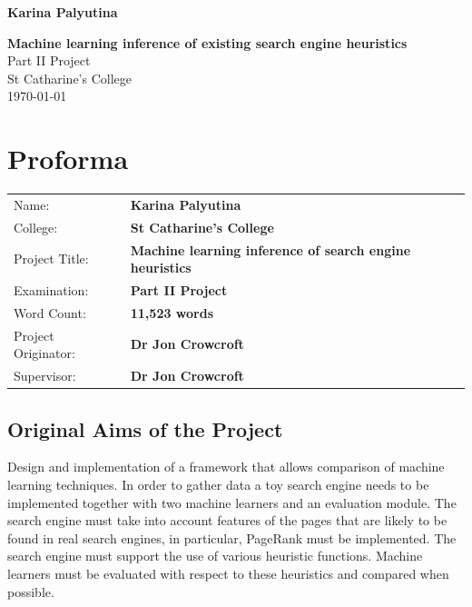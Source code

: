 \documentclass[12pt,a4paper,notitlepage,twoside]{scrbook}
\begin{document}



\begin{titlepage}
\hfill{\LARGE \bf Karina Palyutina}

\vspace*{60mm}
\begin{center}
\Huge
{\bf Machine learning inference of existing search engine heuristics} \\
\vspace*{5mm}
Part II Project \\
\vspace*{5mm}
St Catharine's College \\
\vspace*{5mm}
\today  %
\end{center}
\end{titlepage}


\setcounter{page}{1}

\chapter*{Proforma}

{\large
\begin{tabular}{ll}
Name:               & \bf Karina Palyutina                       \\
College:            & \bf St Catharine's College                     \\
Project Title:      & \bf Machine learning inference of search engine heuristics \\
Examination:        & \bf Part II Project        \\
Word Count:         & \bf 11,523 words     \\
Project Originator: & \bf Dr Jon Crowcroft                    \\
Supervisor:         & \bf Dr Jon Crowcroft                  \\ 
\end{tabular}
}


\newpage

\section*{Original Aims of the Project}
Design and implementation of a framework that allows comparison of machine learning
techniques. In order to gather data a toy search engine needs to be implemented together
with two machine learners and an evaluation module. The search engine must take into account
features of the pages that are likely to be found in real search engines, in particular,
PageRank must be implemented. The search engine must support the use of various heuristic
functions. Machine learners must be evaluated with respect to these heuristics and
compared when possible. 
\end{document}
